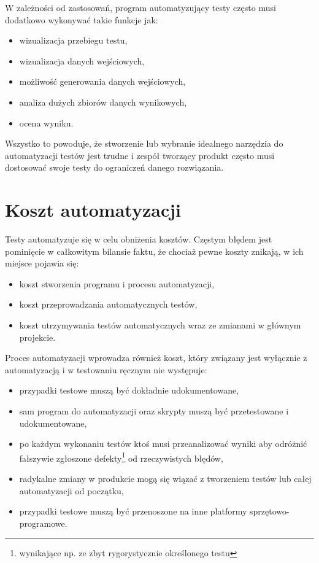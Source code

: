 \documentclass[00-praca-magisterska.tex]{subfiles}
\begin{document}
W zależności od zastosowań, program automatyzujący testy często musi dodatkowo
wykonywać takie funkcje jak:
\begin{itemize}
\item wizualizacja przebiegu testu,
\item wizualizacja danych wejściowych,
\item możliwość generowania danych wejściowych,
\item analiza dużych zbiorów danych wynikowych,
\item ocena wyniku.
\end{itemize}

Wszystko to powoduje, że stworzenie lub wybranie idealnego narzędzia do
automatyzacji testów jest trudne i zespół tworzący produkt często musi
dostosować swoje testy do ograniczeń danego rozwiązania.

\section{Koszt automatyzacji}
\label{koszt-automatyzacji}

Testy automatyzuje się w celu obniżenia kosztów. Częstym błędem jest pominięcie
w całkowitym bilansie faktu, że chociaż pewne koszty znikają, w ich miejsce
pojawia się:
\begin{itemize}
\item koszt stworzenia programu i procesu automatyzacji,
\item koszt przeprowadzania automatycznych testów,
\item koszt utrzymywania testów automatycznych wraz ze zmianami w głównym
projekcie.
\end{itemize}

Proces automatyzacji wprowadza również koszt, który związany jest wyłącznie z
automatyzacją i w testowaniu ręcznym nie występuje:
\begin{itemize}
\item przypadki testowe muszą być dokładnie udokumentowane,
\item sam program do automatyzacji oraz skrypty muszą być przetestowane i
udokumentowane,
\item po każdym wykonaniu testów ktoś musi przeanalizować wyniki aby odróżnić
fałszywie zgłoszone defekty\footnote{wynikające np. ze zbyt rygorystycznie
określonego testu} od rzeczywistych błędów,
\item radykalne zmiany w produkcie mogą się wiązać z tworzeniem testów lub
całej automatyzacji od początku,
\item przypadki testowe muszą być przenoszone na inne platformy
sprzętowo-programowe.
\end{itemize}
\end{document}
